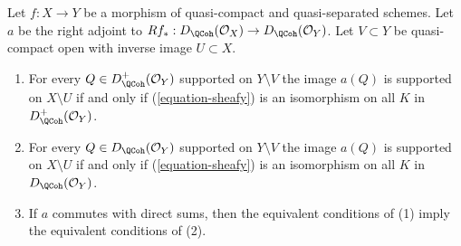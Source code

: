 \begin{lemma}
\label{lemma-when-sheafy}
Let $f : X \to Y$ be a morphism of quasi-compact and quasi-separated
schemes. Let $a$ be the right adjoint to
$Rf_* : D_\QCoh(\mathcal{O}_X) \to D_\QCoh(\mathcal{O}_Y)$.
Let $V \subset Y$ be quasi-compact open with inverse image $U \subset X$.
\begin{enumerate}
\item For every $Q \in D_\QCoh^+(\mathcal{O}_Y)$
supported on $Y \setminus V$ the image $a(Q)$ is supported on
$X \setminus U$ if and only if (\ref{equation-sheafy})
is an isomorphism on all $K$ in $D_\QCoh^+(\mathcal{O}_Y)$.
\item For every $Q \in D_\QCoh(\mathcal{O}_Y)$
supported on $Y \setminus V$ the image $a(Q)$ is supported on
$X \setminus U$ if and only if (\ref{equation-sheafy})
is an isomorphism on all $K$ in $D_\QCoh(\mathcal{O}_Y)$.
\item If $a$ commutes with direct sums, then the equivalent conditions of
(1) imply the equivalent conditions of (2).
\end{enumerate}
\end{lemma}

